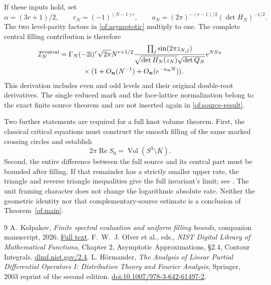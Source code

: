 \documentclass[11pt]{article}
\numberwithin{equation}{section}
\theoremstyle{definition}\newtheorem{definition}[theorem]{Definition}
\theoremstyle{remark}\newtheorem{remark}[theorem]{Remark}
\newcommand{\ii}{\mathrm i}
\newcommand{\Rea}{\operatorname{Re}}
\begin{document}
If these inputs hold, set
\[
 \alpha=(3r+1)/2,\qquad \varepsilon_N=(-1)^{(N-1)r},\qquad
 a_N=(2\pi)^{-(r-1)/2}(\det H_N)^{-1/2}.
\]
The two level-parity factors in \eqref{of:asymptotic} multiply to
one. The complete central filling contribution is therefore
\begin{equation}\label{of:source-result}
\begin{split}
 \mathcal I_N^{\rm central}
 ={}&\Gamma_N(-2\ii)^r\sqrt{2\pi}N^{r+1/2}
   \frac{\prod_j\sin(2\pi z_{N,j})}
        {\sqrt{\det H_N(z_N)}\sqrt{\det Q_N}}e^{NS_N}\\
 &\qquad\times
       (1+O_{\boldsymbol n}(N^{-1})
                       +O_{\boldsymbol n}(e^{-\kappa_{\boldsymbol n}N})).
\end{split}
\end{equation}
This derivation includes even and odd levels and their original
double-root derivatives. The single reduced mark and the face-lattice
normalization belong to the exact finite source theorem and are not
inserted again in \eqref{of:source-result}.

Two further statements are required for a full knot volume theorem.
First, the classical critical equations must construct the smooth
filling of the same marked crossing circles and establish
\[
                  2\pi\Rea S_0=\operatorname{Vol}(S^3\setminus K).
\]
Second, the entire difference between the full source and its central
part must be bounded after filling. If that remainder has a strictly
smaller upper rate, the triangle and reverse triangle inequalities
give the full invariant's limit; see
\cite[Proposition 11.2]{FinitePaper}. The unit framing character
does not change the logarithmic absolute rate. Neither the geometric
identity nor that complementary-source estimate is a conclusion of
Theorem~\ref{of:main}.

\begin{thebibliography}{9}
A.~Kolpakov, \emph{Finite spectral evaluation and uniform filling bounds}, companion
manuscript, 2026.
\href{https://github.com/sashakolpakov/murakamis_dream/blob/conway-series-2026-11-25/docs/papers/filling-bounds.pdf}{Full text}.
F.~W.~J. Olver et al., eds., \emph{NIST Digital Library of Mathematical
Functions}, Chapter 2, Asymptotic Approximations, \S2.4, Contour Integrals.
\href{https://dlmf.nist.gov/2.4}{dlmf.nist.gov/2.4}.
L. H\"ormander, \emph{The Analysis of Linear Partial Differential
Operators I: Distribution Theory and Fourier Analysis}, Springer,
2003 reprint of the second edition.
\href{https://doi.org/10.1007/978-3-642-61497-2}{doi:10.1007/978-3-642-61497-2}.
\end{thebibliography}
\end{document}
